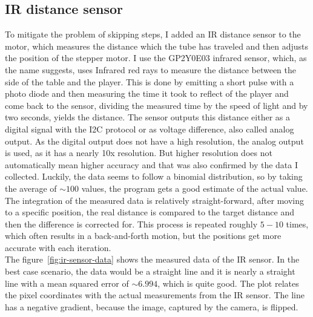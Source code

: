 \subsection{IR distance sensor}\label{subsec:ir-distance-sensor}
To mitigate the problem of skipping steps, I added an IR distance sensor to the motor, which measures the distance which the tube has traveled and then adjusts the position of the stepper motor.
I use the GP2Y0E03\autocite{ir-sensor} infrared sensor, which, as the name suggests, uses Infrared red rays to measure the distance between the side of the table and the player.
This is done by emitting a short pulse with a photo diode and then measuring the time it took to reflect of the player and come back to the sensor, dividing the measured time by the speed of light and by two seconds, yields the distance.
The sensor outputs this distance either as a digital signal with the I2C\autocite{i2c} protocol or as voltage difference, also called analog output.
As the digital output does not have a high resolution, the analog output is used, as it has a nearly 10x resolution.
But higher resolution does not automatically mean higher accuracy and that was also confirmed by the data I collected.
Luckily, the data seems to follow a binomial distribution, so by taking the average of $\sim 100$ values, the program gets a good estimate of the actual value.
The integration of the measured data is relatively straight-forward, after moving to a specific position, the real distance is compared to the target distance and then the difference is corrected for.
This process is repeated roughly $5-10$ times, which often results in a back-and-forth motion, but the positions get more accurate with each iteration.\\
The figure~\ref{fig:ir-sensor-data} shows the measured data of the IR sensor.
In the best case scenario, the data would be a straight line and it is nearly a straight line with a mean squared error\autocite{mean-sqrt-error} of $\sim 6.994$, which is quite good.
The plot relates the pixel coordinates with the actual measurements from the IR sensor.
The line has a negative gradient, because the image, captured by the camera, is flipped.

